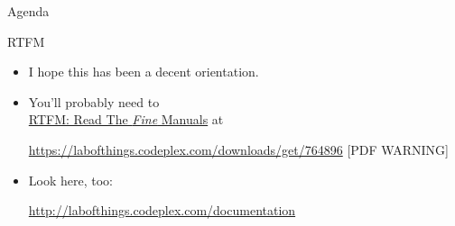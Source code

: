 \documentclass[11pt]{beamer}
\begin{document}
\begin{frame}{Agenda}
\tableofcontents
\end{frame}

\begin{frame}{RTFM}
    \begin{itemize}
        \item I hope this has been a decent orientation.
        \item You'll probably need to \\
        
        \href{https://labofthings.codeplex.com/downloads/get/764896}{\large RTFM: Read The \textit{Fine} Manuals} at
        
        {\small\url{https://labofthings.codeplex.com/downloads/get/764896} [PDF WARNING]}
        
        \item Look here, too:
        
        {\small\url{http://labofthings.codeplex.com/documentation}}
        
    \end{itemize}
\end{frame}
\end{document}
